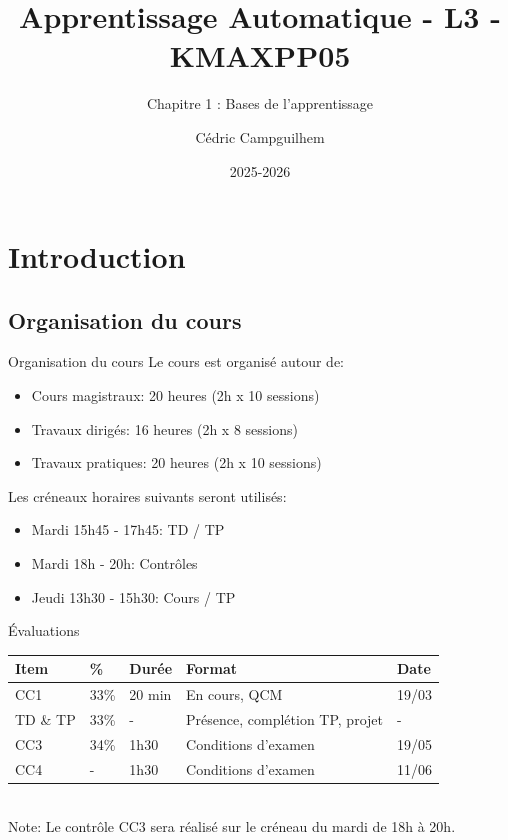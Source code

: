 \documentclass[10pt]{beamer}  %
\title{Apprentissage Automatique - L3 - KMAXPP05}
\subtitle{Chapitre 1 : Bases de l'apprentissage}
\author{Cédric Campguilhem}
\institute[]{
	Airbus Operations \\
	\href{mailto:cedric.campguilhem@airbus.com}{\texttt{cedric.campguilhem@airbus.com}}
}
\date{2025-2026}
\begin{document}
\begin{frame}
  \titlepage
\end{frame}


\section[Introduction]{Introduction}

\subsection[Organisation du cours]{Organisation du cours}

\begin{frame}{Organisation du cours}
	Le cours est organisé autour de:
	\begin{itemize}
		\item Cours magistraux: 20 heures (2h x 10 sessions)
		\item Travaux dirigés: 16 heures (2h x 8 sessions)
		\item Travaux pratiques: 20 heures (2h x 10 sessions)
	\end{itemize}
	\vspace{0.5cm}
	Les créneaux horaires suivants seront utilisés:
	\begin{itemize}
		\item Mardi 15h45 - 17h45: TD / TP
		\item Mardi 18h - 20h: Contrôles
		\item Jeudi 13h30 - 15h30: Cours / TP
	\end{itemize}
\end{frame}

\begin{frame}{Évaluations}
	\begin{tabular}{|l|l|l|l|l|}
		\hline
		\textbf{Item} & \textbf{\%} & \textbf{Durée} & \textbf{Format} & \textbf{Date} \\
		\hline
		CC1 & 33\% & 20 min & En cours, QCM & 19/03 \\
		\hline
		TD \& TP & 33\% & - & Présence, complétion TP, projet & - \\
		\hline
		CC3 & 34\% & 1h30 & Conditions d'examen & 19/05 \\
		\hline
		CC4 & - & 1h30 & Conditions d'examen & 11/06 \\
		\hline
	\end{tabular} \\
	\vspace{0.5cm}
	Note: Le contrôle CC3 sera réalisé sur le créneau du mardi de 18h à 20h.
\end{frame}
\end{document}
